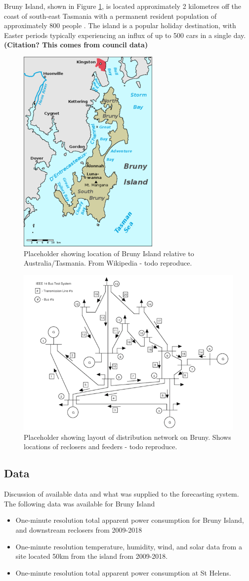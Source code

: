 \documentclass[conference]{IEEEtran}
\begin{document}
Bruny Island, shown in Figure \ref{fig:bruny_map}, is located approximately 2 kilometres off the coast of south-east Tasmania with a permanent resident population of approximately 800 people \cite{census2016}.
The island is a popular holiday destination, with Easter periods typically experiencing an influx of up to 500 cars in a single day. \textbf{(Citation? This comes from council data)}


\begin{figure}[htbp]
	\centerline{\includegraphics[width=.35\textwidth]{images/bruny_island_map.png}}
	\caption{Placeholder showing location of Bruny Island relative to Australia/Tasmania. From Wikipedia - todo reproduce.}
	\label{fig:bruny_map}
\end{figure}

\begin{figure}[htbp]
	\centerline{\includegraphics[width=.35\textwidth]{images/bruny_network.png}}
	\caption{Placeholder showing layout of distribution network on Bruny. Shows locations of reclosers and feeders - todo reproduce.}
	\label{fig:bruny_network}
\end{figure}

\subsection{Data}
Discussion of available data and what was supplied to the forecasting system.
The following data was available for Bruny Island
\begin{itemize}
	\item One-minute resolution total apparent power consumption for Bruny Island, and downstream reclosers from 2009-2018
	\item One-minute resolution temperature, humidity, wind, and solar data from a site located 50km from the island from 2009-2018. 
	\item One-minute resolution total apparent power consumption at  St Helens. 
\end{itemize}
\end{document}
